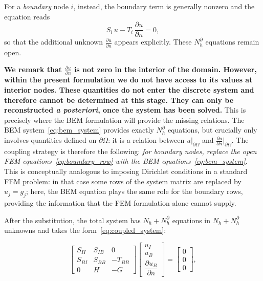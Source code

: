\documentclass[11pt,onecolumn]{article}
\begin{document}
For a \textit{boundary} node $i$, instead, the boundary term is generally nonzero and the equation reads
\begin{equation}
S_i\, u - T_i\, \frac{\partial u}{\partial n} = 0,
\label{eq:boundary_row}
\end{equation}
so that the additional unknown $\frac{\partial u}{\partial n}$ appears explicitly. These $N_h^{\partial}$ equations remain open.

\textbf{We remark that $\frac{\partial u}{\partial n}$ is not zero in the interior of the domain. However, within the present formulation we do not have access to its values at interior nodes. These quantities do not enter the discrete system and therefore cannot be determined at this stage. They can only be reconstructed \textit{a posteriori}, once the system has been solved.}
This is precisely where the BEM formulation will provide the missing relations.
The BEM system~\eqref{eq:bem_system} provides exactly $N_h^\partial$ equations, but crucially only involves quantities defined on $\partial\Omega$: it is a relation between $u|_{\partial\Omega}$ and $\frac{\partial u}{\partial n}|_{\partial\Omega}$. The coupling strategy is therefore the following: \textit{for boundary nodes, replace the open FEM equations~\eqref{eq:boundary_row} with the BEM equations~\eqref{eq:bem_system}}. This is conceptually analogous to imposing Dirichlet conditions in a standard FEM problem: in that case some rows of the system matrix are replaced by $u_j = g_j$; here, the BEM equation plays the same role for the boundary rows, providing the information that the FEM formulation alone cannot supply.

After the substitution, the total system has $N_h + N_h^\partial$ equations in $N_h + N_h^\partial$ unknowns and takes the form~\eqref{eq:coupled_system}:

\begin{equation}
\begin{bmatrix}
S_{II} & S_{IB} & 0 \\
S_{BI} & S_{BB} & -T_{BB} \\
0 & H & -G
\end{bmatrix}
\begin{bmatrix}
u_I \\ u_B \\ \dfrac{\partial u_B}{\partial n}
\end{bmatrix}
=
\begin{bmatrix}
0 \\ 0 \\ 0
\end{bmatrix},
\label{eq:coupled_system}
\end{equation}
\end{document}
